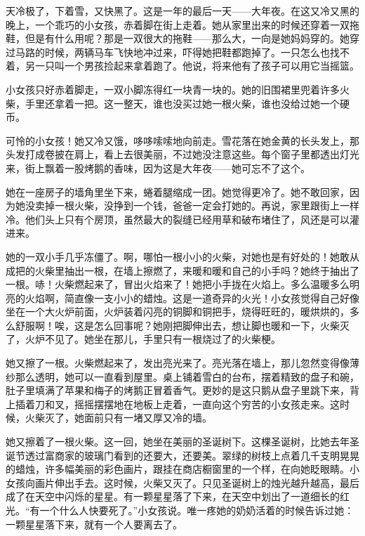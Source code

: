 \documentclass[12pt,UTF-8,openany]{ctexbook}
\begin{document}
\begin{large}
    
    天冷极了，下着雪，又快黑了。这是一年的最后一天——大年夜。在这又冷又黑的晚上，一个乖巧的小女孩，赤着脚在街上走着。她从家里出来的时候还穿着一双拖鞋，但是有什么用呢？那是一双很大的拖鞋——那么大，一向是她妈妈穿的。她穿过马路的时候，两辆马车飞快地冲过来，吓得她把鞋都跑掉了。一只怎么也找不着，另一只叫一个男孩捡起来拿着跑了。他说，将来他有了孩子可以用它当摇篮。
    
    小女孩只好赤着脚走，一双小脚冻得红一块青一块的。她的旧围裙里兜着许多火柴，手里还拿着一把。这一整天，谁也没买过她一根火柴，谁也没给过她一个硬币。
    
    可怜的小女孩！她又冷又饿，哆哆嗦嗦地向前走。雪花落在她金黄的长头发上，那头发打成卷披在肩上，看上去很美丽，不过她没注意这些。每个窗子里都透出灯光来，街上飘着一股烤鹅的香味，因为这是大年夜——她可忘不了这个。
    
    她在一座房子的墙角里坐下来，蜷着腿缩成一团。她觉得更冷了。她不敢回家，因为她没卖掉一根火柴，没挣到一个钱，爸爸一定会打她的。再说，家里跟街上一样冷。他们头上只有个房顶，虽然最大的裂缝已经用草和破布堵住了，风还是可以灌进来。
    
    她的一双小手几乎冻僵了。啊，哪怕一根小小的火柴，对她也是有好处的！她敢从成把的火柴里抽出一根，在墙上擦燃了，来暖和暖和自己的小手吗？她终于抽出了一根。哧！火柴燃起来了，冒出火焰来了！她把小手拢在火焰上。多么温暖多么明亮的火焰啊，简直像一支小小的蜡烛。这是一道奇异的火光！小女孩觉得自己好像坐在一个大火炉前面，火炉装着闪亮的铜脚和铜把手，烧得旺旺的，暖烘烘的，多么舒服啊！唉，这是怎么回事呢？她刚把脚伸出去，想让脚也暖和一下，火柴灭了，火炉不见了。她坐在那儿，手里只有一根烧过了的火柴梗。
    
    她又擦了一根。火柴燃起来了，发出亮光来了。亮光落在墙上，那儿忽然变得像薄纱那么透明，她可以一直看到屋里。桌上铺着雪白的台布，摆着精致的盘子和碗，肚子里填满了苹果和梅子的烤鹅正冒着香气。更妙的是这只鹅从盘子里跳下来，背上插着刀和叉，摇摇摆摆地在地板上走着，一直向这个穷苦的小女孩走来。这时候，火柴灭了，她面前只有一堵又厚又冷的墙。
    
    她又擦着了一根火柴。这一回，她坐在美丽的圣诞树下。这棵圣诞树，比她去年圣诞节透过富商家的玻璃门看到的还要大，还要美。翠绿的树枝上点着几千支明晃晃的蜡烛，许多幅美丽的彩色画片，跟挂在商店橱窗里的一个样，在向她眨眼睛。小女孩向画片伸出手去。这时候，火柴又灭了。只见圣诞树上的烛光越升越高，最后成了在天空中闪烁的星星。有一颗星星落了下来，在天空中划出了一道细长的红光。“有一个什么人快要死了。”小女孩说。唯一疼她的奶奶活着的时候告诉过她：一颗星星落下来，就有一个人要离去了。
    

\end{large}
\end{document}
